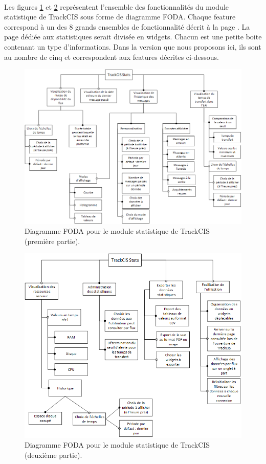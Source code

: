 			\paragraph{}
			Les figures \ref{foda_1} et \ref{foda_2} représentent l'ensemble des
			fonctionnalités du module statistique de TrackCIS sous forme de diagramme FODA.
			Chaque feature correspond à un des 8 grands ensembles de fonctionnalité décrit à
			la page \pageref{ensembles_fonctios}.\newline
			La page dédiée aux statistiques serait divisée en widgets. Chacun est une
			petite boite contenant un type d'informations. Dans la version que nous proposons ici,
			ils sont au nombre de cinq et correspondent aux features décrites ci-dessous.
			\begin{figure}%
				\centering
				\includegraphics[width=17cm]{../img/part2/foda_1.png}
				\caption{\label{foda_1} Diagramme FODA pour le module statistique de
				TrackCIS (première partie).}
			\end{figure}
			\begin{figure}%
				\centering
				\includegraphics[width=17cm]{../img/part2/foda_2.png}
				\caption{\label{foda_2} Diagramme FODA pour le module statistique de
				TrackCIS (deuxième partie).}
			\end{figure}
			
